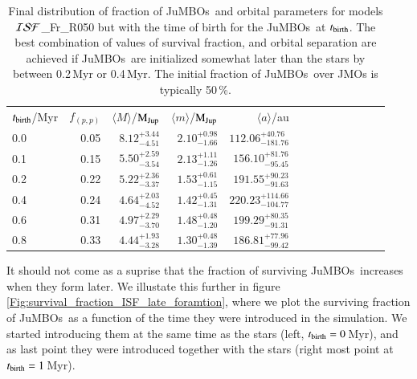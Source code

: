 \documentclass[submission,phys]{lib/SciPost}
\newcommand{\MJup}{\mbox{$\mathrm{{M}}_{\rm Jup}$}}
\newcommand{\jumbos}{\mbox{JuMBOs}}
\begin{document}
\begin{table}
  \caption{Final distribution of fraction of \jumbos\, and orbital
    parameters for models ${\cal ISF}$\_Fr\_R050 but with the time of
    birth for the \jumbos\, at $t_{\rm birth}$.  The best combination
    of values of survival fraction, and orbital separation are
    achieved if \jumbos\, are initialized somewhat later than the
    stars by between 0.2\,Myr or 0.4\,Myr.  The initial fraction of
    \jumbos\, over JMOs is typically 50\,\%.  }
 \label{Tab:late_formed_jumbos}
 \centering 
 \begin{tabular}{lrrrrrrrrrrrr}
   \hline\hline
 $t_{\rm birth}$/Myr & $f_{(p,p)}$  & $\langle M \rangle$/\MJup & $\langle m \rangle$/\MJup & $\langle a \rangle$/au \\
 0.0 & 0.05 &  $8.12^{+3.44}_{-4.51}$ & $2.10^{+0.98}_{-1.66}$ & $112.06^{+40.76}_{-181.76}$ \\
 0.1 & 0.15 &  $5.50^{+2.59}_{-3.54}$ & $2.13^{+1.11}_{-1.26}$ & $156.10^{+81.76}_{-95.45}$ \\
 0.2 & 0.22 &  $5.22^{+2.36}_{-3.37}$ & $1.53^{+0.61}_{-1.15}$ & $191.55^{+90.23}_{-91.63}$\\
 0.4 & 0.24 &  $4.64^{+2.03}_{-4.52}$ & $1.42^{+0.45}_{-1.31}$ & $220.23^{+114.66}_{-104.77}$\\
 0.6 & 0.31 &  $4.97^{+2.29}_{-3.70}$ & $1.48^{+0.48}_{-1.20}$ & $199.29^{+80.35}_{-91.31}$ \\
 0.8 & 0.33 &  $4.44^{+1.93}_{-3.28}$ & $1.30^{+0.48}_{-1.39}$ & $186.81^{+77.96}_{-99.42}$ \\
  \hline
 \end{tabular}
\end{table}

It should not come as a suprise that the fraction of surviving
\jumbos\, increases when they form later. We illustate this further in
figure\,\ref{Fig:survival_fraction_ISF_late_foramtion}, where we plot
the surviving fraction of \jumbos\, as a function of the time they
were introduced in the simulation. We started introducing them at the
same time as the stars (left, $t_{\rm birth} = 0$\,Myr), and as last
point they were introduced together with the stars (right most point
at $t_{\rm birth} = 1$\,Myr).
\end{document}

